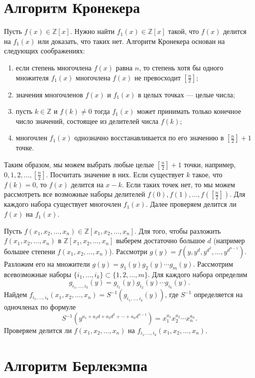 \documentclass[12pt, titlepage, oneside]{amsbook}
\newcommand{\ZZ}{\mathbb{Z}}
\theoremstyle{definition}
\theoremstyle{remark}
\begin{document}
\section{Алгоритм Кронекера}

Пусть $f(x)\in\ZZ[x]$. Нужно найти $f_1(x)\in\ZZ[x]$ такой, что $f(x)$ делится на $f_1(x)$ или доказать, что таких нет. Алгоритм Кронекера основан на следующих
соображениях:
\begin{enumerate}
	\item если степень многочлена $f(x)$ равна $n$, то степень хотя бы одного множителя $f_1(x)$ многочлена $f(x)$ не превосходит $[\frac{n}{2}]$;
	\item значения многочленов $f(x)$ и $f_1(x)$ в целых точках --- целые числа;
	\item пусть $k\in\ZZ$ и $f(k)\neq 0$ тогда $f_1(x)$ может принимать только конечное число значений, состоящее из
	      делителей числа $f(k)$;
	\item многочлен $f_1(x)$ однозначно восстанавливается по его значению в $[\frac{n}{2}]+1$ точке.
\end{enumerate}

Таким образом, мы можем выбрать любые целые $[\frac{n}{2}]+1$ точки, например, $0,1,2,\ldots,[\frac{n}{2}]$. Посчитать значение в них. Если существует $k$ такое, что $f(k)=0$, то $f(x)$ делится на $x-k$. Если таких точек нет, то мы можем рассмотреть все возможные наборы делителей $f(0),f(1),\ldots,f([\frac{n}{2}])$. Для каждого набора существует многочлен $f_1(x)$. Далее проверяем делится ли $f(x)$ на $f_1(x)$.

Пусть $f(x_1,x_2,\ldots,x_n)\in\ZZ[x_1,x_2,\ldots,x_n]$. Для того, чтобы разложить $f(x_1,x_2,\ldots,x_n)$ в $\ZZ[x_1,x_2,\ldots,x_n]$ выберем достаточно большое $d$ (например большее степени $f(x_1,x_2,\ldots,x_n)$). Рассмотри $g(y)=f(y,y^d,y^{d^2},\ldots,y^{d^{n-1}})$. Разложим его на множители $g(y)=g_1(y)g_2(y)\cdots g_m(y)$. Рассмотрим всевозможные наборы $\{i_1,\ldots,i_k\}\subset\{1,2,\ldots,m\}$. Для каждого набора определим $$g_{i_1,\ldots,i_k}(y)=g_{i_1}(y)g_{i_2}(y)\cdots g_{i_k}(y).$$ Найдем $f_{i_1,\ldots,i_k}(x_1,x_2,\ldots,x_n)=S^{-1}(g_{i_1,\ldots,i_k}(y))$, где $S^{-1}$ определяется на
одночленах по формуле $$S^{-1}(y^{a_1+a_2d+a_3d^2+\cdots+a_nd^{n-1}})=x_1^{a_1}x_2^{a_2}\cdots x_n^{a_n}.$$ Проверяем делится ли $f(x_1,x_2,\ldots,x_n)$ на $f_{i_1,\ldots,i_k}(x_1,x_2,\ldots,x_n)$.

\section{Алгоритм Берлекэмпа}
\end{document}
